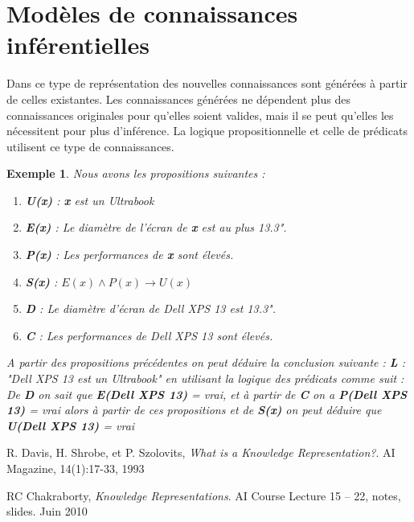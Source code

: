 \documentclass[12pt,a4paper]{report}
\newtheorem{example}{Exemple}
\begin{document}
\section{Modèles de connaissances inférentielles}
Dans ce type de représentation des nouvelles connaissances sont générées à partir de celles existantes.
Les connaissances générées ne dépendent plus des connaissances originales pour qu'elles soient valides, mais
il se peut qu'elles les nécessitent pour plus d'inférence.\cite{KRC} La logique propositionnelle et celle de
prédicats utilisent ce type de connaissances.

\begin{example}
Nous avons les propositions suivantes :
\begin{enumerate}
\item \textbf{U(x)} : \textbf{x} est un Ultrabook
\item \textbf{E(x)} : Le diamètre de l'écran de \textbf{x} est au plus 13.3".
\item \textbf{P(x)} : Les performances de \textbf{x} sont élevés.
\item \textbf{S(x)} : $ E(x) \wedge P(x) \rightarrow U(x) $
\item \textbf{D} : Le diamètre d'écran de Dell XPS 13 est 13.3".
\item \textbf{C} : Les performances de Dell XPS 13 sont élevés.
\end{enumerate}
A partir des propositions précédentes on peut déduire la conclusion suivante :
\textbf{L} : "Dell XPS 13 est un Ultrabook"  en utilisant la logique des prédicats comme suit :
De \textbf{D} on sait que \textbf{E(Dell XPS 13)} = vrai, et à partir de \textbf{C} on a \textbf{P(Dell XPS 13)} = vrai
alors à partir de ces propositions et de \textbf{S(x)} on peut déduire que \textbf{U(Dell XPS 13)} = vrai
\end{example}

\begin{thebibliography}{9}
R. Davis, H. Shrobe, et P. Szolovits,
\emph{What is a Knowledge Representation?}.
AI Magazine, 14(1):17-33, 1993

RC Chakraborty,
\emph{Knowledge Representations}.
AI Course Lecture 15 – 22, notes, slides. Juin 2010 
\end{thebibliography}
\end{document}
